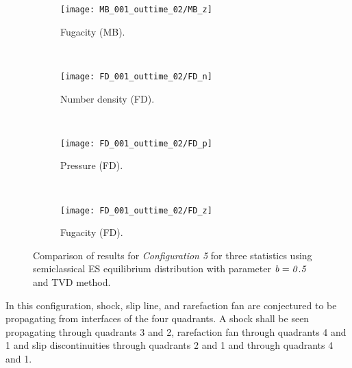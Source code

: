 \documentclass{rsproca}%
\begin{document}
\begin{figure}
        \begin{subfigure}[b]{0.32\textwidth}
                \centering
                \texttt{[image: MB\_001\_outtime\_02/MB\_z]}
                \caption{Fugacity (MB).}
                \label{fig:5ESBGK_MB_z_tau001}
        \end{subfigure}
        ~ %
        \begin{subfigure}[b]{0.32\textwidth}
                \centering
                \texttt{[image: FD\_001\_outtime\_02/FD\_n]}
                \caption{Number density (FD).}
                \label{fig:5ESBGK_FD_n_tau001}
        \end{subfigure}
        ~ %
        \begin{subfigure}[b]{0.32\textwidth}
                \centering
                \texttt{[image: FD\_001\_outtime\_02/FD\_p]}
                \caption{Pressure (FD).}
                \label{fig:5ESBGK_FD_p_tau001}
        \end{subfigure}
				~ %
        \begin{subfigure}[b]{0.32\textwidth}
                \centering
                \texttt{[image: FD\_001\_outtime\_02/FD\_z]}
                \caption{Fugacity (FD).}
                \label{fig:5ESBGK_FD_z_tau001}
        \end{subfigure}
				\caption{Comparison of results for \emph{Configuration 5} for three statistics using semiclassical ES equilibrium distribution with parameter $\it{b=0.5}$ and TVD method.}
				\label{fig:test_configuration5_tau001}
\end{figure}

In this configuration, shock, slip line, and rarefaction fan are conjectured to be propagating from interfaces of the four quadrants. A shock shall be seen propagating through quadrants 3 and 2, rarefaction fan through quadrants 4 and 1 and slip discontinuities through quadrants 2 and 1 and through quadrants 4 and 1. \\
\end{document}

